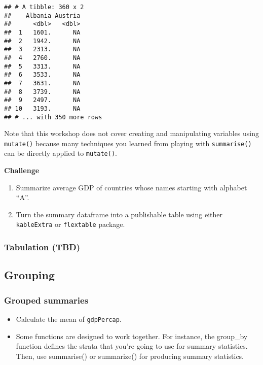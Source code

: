 \documentclass[
]{book}
\begin{document}
\begin{verbatim}
## # A tibble: 360 x 2
##    Albania Austria
##      <dbl>   <dbl>
##  1   1601.      NA
##  2   1942.      NA
##  3   2313.      NA
##  4   2760.      NA
##  5   3313.      NA
##  6   3533.      NA
##  7   3631.      NA
##  8   3739.      NA
##  9   2497.      NA
## 10   3193.      NA
## # ... with 350 more rows
\end{verbatim}

Note that this workshop does not cover creating and manipulating variables using \texttt{mutate()} because many techniques you learned from playing with \texttt{summarise()} can be directly applied to \texttt{mutate()}.

\textbf{Challenge}

\begin{enumerate}
\def\labelenumi{\arabic{enumi}.}
\item
  Summarize average GDP of countries whose names starting with alphabet ``A''.
\item
  Turn the summary dataframe into a publishable table using either \texttt{kableExtra} or \texttt{flextable} package.
\end{enumerate}

\hypertarget{tabulation-tbd}{%
\subsubsection{Tabulation (TBD)}\label{tabulation-tbd}}

\hypertarget{grouping}{%
\subsection{Grouping}\label{grouping}}

\hypertarget{grouped-summaries}{%
\subsubsection{Grouped summaries}\label{grouped-summaries}}

\begin{itemize}
\item
  Calculate the mean of \texttt{gdpPercap}.
\item
  Some functions are designed to work together. For instance, the group\_by
  function defines the strata that you're going to use for summary statistics. Then, use summarise() or summarize() for producing summary statistics.
\end{itemize}
\end{document}
